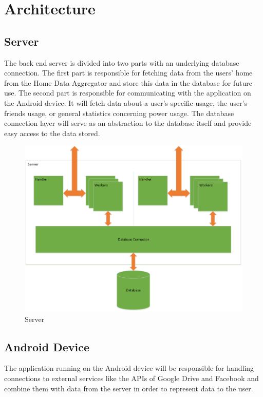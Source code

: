 \section{Architecture}
\subsection{Server}
The back end server is divided into two parts with an underlying database connection. 
The first part is responsible for fetching data from the users' home from the Home Data Aggregator and store
this data in the database for future use. The second part is responsible for communicating with the application on the 
Android device. It will fetch data about a user's specific usage, the user's friends usage, or general statistics 
concerning power usage. The database connection layer will serve as an abstraction to the database itself and provide 
easy access to the data stored.

\begin{figure}[H]
\includegraphics[width=\textwidth]{ch/projectPlan/fig/server.png}
\caption{Server}
\end{figure}

\subsection{Android Device}
The application running on the Android device will be responsible for handling connections to external 
services like the APIs of Google Drive and Facebook and combine them with data from the server in order to represent 
data to the user.

